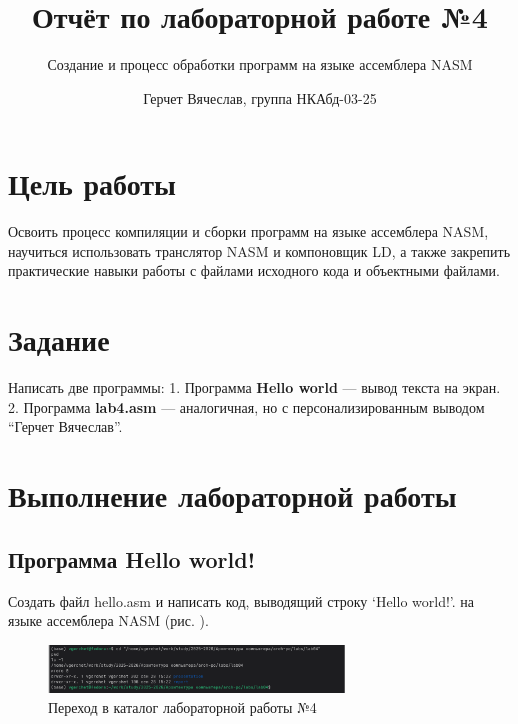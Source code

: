 \documentclass[
  12pt,
  a4paper,
  DIV=11,
  numbers=noendperiod]{scrreprt}
\title{Отчёт по лабораторной работе №4}
\subtitle{Создание и процесс обработки программ на языке ассемблера
NASM}
\author{Герчет Вячеслав, группа НКАбд-03-25}
\date{}
\renewcommand*\contentsname{Содержание}
\newcommand\contentsname{Содержание}
\begin{document}
\maketitle

\renewcommand*\contentsname{Содержание}
{
\setcounter{tocdepth}{1}
\tableofcontents
}
\listoffigures
\listoftables

\chapter{Цель
работы}\label{ux446ux435ux43bux44c-ux440ux430ux431ux43eux442ux44b}

Освоить процесс компиляции и сборки программ на языке ассемблера NASM,
научиться использовать транслятор NASM и компоновщик LD, а также
закрепить практические навыки работы с файлами исходного кода и
объектными файлами.

\chapter{Задание}\label{ux437ux430ux434ux430ux43dux438ux435}

Написать две программы: 1. Программа \textbf{Hello world} --- вывод
текста на экран. 2. Программа \textbf{lab4.asm} --- аналогичная, но с
персонализированным выводом \enquote{Герчет Вячеслав}.

\chapter{Выполнение лабораторной
работы}\label{ux432ux44bux43fux43eux43bux43dux435ux43dux438ux435-ux43bux430ux431ux43eux440ux430ux442ux43eux440ux43dux43eux439-ux440ux430ux431ux43eux442ux44b}

\section{Программа Hello
world!}\label{ux43fux440ux43eux433ux440ux430ux43cux43cux430-hello-world}

Создать файл hello.asm и написать код, выводящий строку \enquote*{Hello
world!}. на языке ассемблера NASM (рис. \textcite{fig:001}).

\begin{figure}

{\centering \includegraphics[width=0.7\textwidth,height=\textheight]{image/1.png}

}

\caption{Переход в каталог лабораторной работы №4}

\end{figure}%
\end{document}

